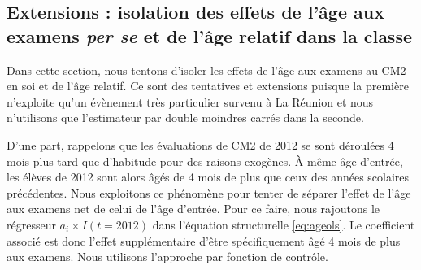 \documentclass[
]{book}
\begin{document}
\hypertarget{agemodelssuppres}{%
\subsection{\texorpdfstring{Extensions : isolation des effets de l'âge aux examens \emph{per se} et de l'âge relatif dans la classe}{Extensions : isolation des effets de l'âge aux examens per se et de l'âge relatif dans la classe}}\label{agemodelssuppres}}

Dans cette section, nous tentons d'isoler les effets de l'âge aux examens au CM2 en soi et de l'âge relatif. Ce sont des tentatives et extensions puisque la première n'exploite qu'un évènement très particulier survenu à La Réunion et nous n'utilisons que l'estimateur par double moindres carrés dans la seconde.

\quad D'une part, rappelons que les évaluations de CM2 de 2012 se sont déroulées 4 mois plus tard que d'habitude pour des raisons exogènes. À même âge d'entrée, les élèves de 2012 sont alors âgés de 4 mois de plus que ceux des années scolaires précédentes. Nous exploitons ce phénomène pour tenter de séparer l'effet de l'âge aux examens net de celui de l'âge d'entrée. Pour ce faire, nous rajoutons le régresseur \(a_i \times I(t = 2012)\) dans l'équation structurelle \eqref{eq:ageols}. Le coefficient associé est donc l'effet supplémentaire d'être spécifiquement âgé 4 mois de plus aux examens. Nous utilisons l'approche par fonction de contrôle.
\end{document}

